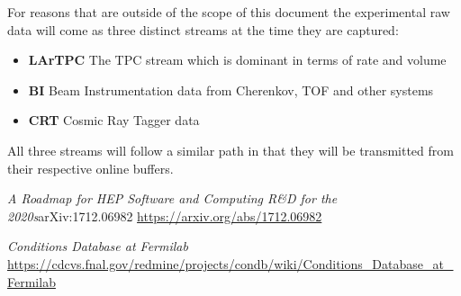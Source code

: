 \documentclass[pdftex,12pt,letter]{article}
\begin{document}
For reasons that are outside of the scope of this document  the experimental raw data
will come as three distinct streams at the time they are captured:
\begin{itemize}
\item \textbf{LArTPC} The TPC  stream which is dominant in terms of rate and volume
\item \textbf{BI} Beam Instrumentation data from Cherenkov, TOF and other systems
\item \textbf{CRT} Cosmic Ray Tagger data
\end{itemize}

\noindent All three streams will follow a similar path in that they will be transmitted from their respective
online buffers.






\clearpage
\begin{thebibliography}{1}
{\textit{A Roadmap for HEP Software and Computing R\&D for the 2020s}arXiv:1712.06982} \url{https://arxiv.org/abs/1712.06982}

{\textit{Conditions Database at Fermilab}  \url{https://cdcvs.fnal.gov/redmine/projects/condb/wiki/Conditions_Database_at_Fermilab}}

\end{thebibliography}
\end{document}
